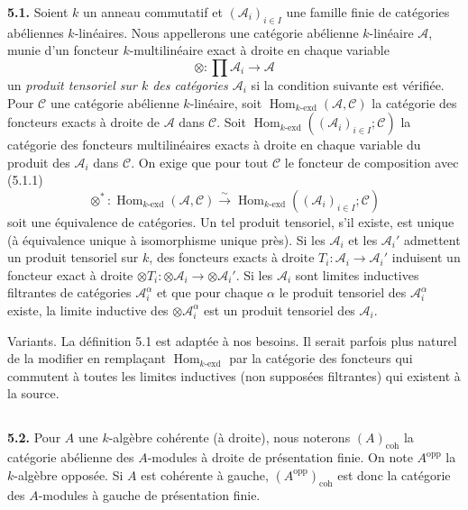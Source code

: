 \documentclass[12pt,a4paper]{article}
\theoremstyle{plain}
\theoremstyle{definition}
\theoremstyle{remark}
\DeclareMathOperator{\Hom}{Hom}
\begin{document}
\textbf{5.1.} Soient $k$ un anneau commutatif et $(\mathcal{A}_i)_{i \in I}$ une famille finie de catégories abéliennes $k$-linéaires. Nous appellerons une catégorie abélienne $k$-linéaire $\mathcal{A}$, munie d'un foncteur $k$-multilinéaire exact à droite en chaque variable
\begin{equation}\label{eq:5.1.1}
\otimes : \prod \mathcal{A}_i \to \mathcal{A}
\end{equation}
un \emph{produit tensoriel sur $k$ des catégories $\mathcal{A}_i$} si la condition suivante est vérifiée. Pour $\mathcal{C}$ une catégorie abélienne $k$-linéaire, soit $\Hom_{k\text{-}\mathrm{exd}}(\mathcal{A}, \mathcal{C})$ la catégorie des foncteurs exacts à droite de $\mathcal{A}$ dans $\mathcal{C}$. Soit $\Hom_{k\text{-}\mathrm{exd}}((\mathcal{A}_i)_{i \in I}; \mathcal{C})$ la catégorie des foncteurs multilinéaires exacts à droite en chaque variable du produit des $\mathcal{A}_i$ dans $\mathcal{C}$. On exige que pour tout $\mathcal{C}$ le foncteur de composition avec (5.1.1)
\[
\otimes^* : \Hom_{k\text{-}\mathrm{exd}}(\mathcal{A}, \mathcal{C}) \xrightarrow{\sim} \Hom_{k\text{-}\mathrm{exd}}((\mathcal{A}_i)_{i \in I}; \mathcal{C})
\]
soit une équivalence de catégories. Un tel produit tensoriel, s'il existe, est unique (à équivalence unique à isomorphisme unique près). Si les $\mathcal{A}_i$ et les $\mathcal{A}_i'$ admettent un produit tensoriel sur $k$, des foncteurs exacts à droite $T_i : \mathcal{A}_i \to \mathcal{A}_i'$ induisent un foncteur exact à droite $\otimes T_i : \otimes \mathcal{A}_i \to \otimes \mathcal{A}_i'$. Si les $\mathcal{A}_i$ sont limites inductives filtrantes de catégories $\mathcal{A}_i^\alpha$ et que pour chaque $\alpha$ le produit tensoriel des $\mathcal{A}_i^\alpha$ existe, la limite inductive des $\otimes \mathcal{A}_i^\alpha$ est un produit tensoriel des $\mathcal{A}_i$.

Variants. La définition 5.1 est adaptée à nos besoins. Il serait parfois plus naturel de la modifier en remplaçant $\Hom_{k\text{-}\mathrm{exd}}$ par la catégorie des foncteurs qui commutent à toutes les limites inductives (non supposées filtrantes) qui existent à la source.

\subsection{}

\textbf{5.2.} Pour $A$ une $k$-algèbre cohérente (à droite), nous noterons $(A)_\mathrm{coh}$ la catégorie abélienne des $A$-modules à droite de présentation finie. On note $A^\mathrm{opp}$ la $k$-algèbre opposée. Si $A$ est cohérente à gauche, $(A^\mathrm{opp})_\mathrm{coh}$ est donc la catégorie des $A$-modules à gauche de présentation finie.
\end{document}
